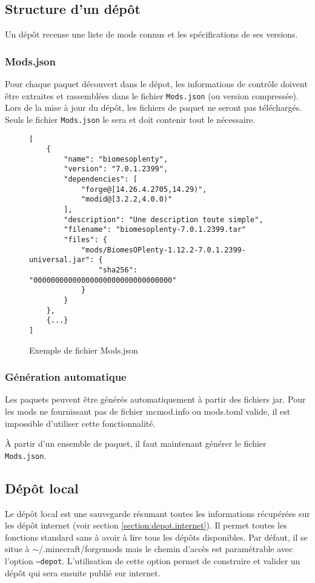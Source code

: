 \documentclass{article}
\begin{document}
\subsection{Structure d'un dépôt}
Un dépôt recense une liste de mods connus et les spécifications de ses versions.

\subsubsection{Mods.json}
Pour chaque paquet découvert dans le dépot, les informations de contrôle doivent être extraites et rassemblées dans le fichier \texttt{Mods.json} (ou version compressée).
Lors de la mise à jour du dépôt, les fichiers de paquet ne seront pas téléchargés.
Seuls le fichier \texttt{Mods.json} le sera et doit contenir tout le nécessaire.

\begin{figure}[h]
\begin{verbatim}
[
    {
        "name": "biomesoplenty",
        "version": "7.0.1.2399",
        "dependencies": [
            "forge@[14.26.4.2705,14.29)",
            "modid@[3.2.2,4.0.0)"
        ],
        "description": "Une description toute simple",
        "filename": "biomesoplenty-7.0.1.2399.tar"
        "files": {
            "mods/BiomesOPlenty-1.12.2-7.0.1.2399-universal.jar": {
                "sha256": "00000000000000000000000000000000"
            }
        }
    },
    {...}
]
\end{verbatim}
\caption{Exemple de fichier \textsf{Mods.json}}
\label{fig:Mods.json}
\end{figure}

\subsubsection{Génération automatique}
Les paquets peuvent être générés automatiquement à partir des fichiers jar.
Pour les mods ne fournissant pas de fichier \textsf{mcmod.info} ou \textsf{mods.toml} valide, il est impossible d'utiliser cette fonctionnalité.

À partir d'un ensemble de paquet, il faut maintenant générer le fichier \texttt{Mods.json}.


\subsection{Dépôt local}
\label{section:depot.local}
Le dépôt local est une sauvegarde résumant toutes les informations récupérées sur les dépôt internet (voir section \ref{section:depot.internet}).
Il permet toutes les fonctions standard sans à avoir à lire tous les dépôts disponibles.
Par défaut, il se situe à \textsf{$\sim$/.minecraft/forgemods} mais le chemin d'accès est paramétrable avec l'option \texttt{--depot}.
L'utilisation de cette option permet de construire et valider un dépôt qui sera ensuite publié sur internet.
\end{document}
